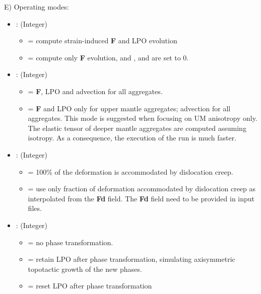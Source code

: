 E) Operating modes:
\begin{itemize}

    \item {}: (Integer)
    \begin{itemize}
        \item[]  = compute strain-induced \textbf{F} and LPO evolution
        \item[]  = compute only \textbf{F} evolution, and ,  and  are set to 0.
    \end{itemize}
    
    \item {}: (Integer)
    \begin{itemize}
        \item[]  = \textbf{F}, LPO and advection for all aggregates.
        \item[]  = \textbf{F} and LPO only for upper mantle aggregates; advection for all aggregates. This mode is suggested when focusing on UM anisotropy only. The elastic tensor of deeper mantle aggregates are computed assuming isotropy. As a consequence, the execution of the run is much faster.
    \end{itemize}
    
    \item {}: (Integer)
    \begin{itemize}
        \item[]  = 100\% of the deformation is accommodated by dislocation creep. 
        \item[]  = use only fraction of deformation accommodated by dislocation creep as interpolated from the \textbf{Fd} field. The \textbf{Fd} field need to be provided in input \vtptitle{} files.
    \end{itemize}
    
    \item {}: (Integer)
    \begin{itemize}
        \item[]  = no phase transformation.
        \item[]  = retain LPO after phase transformation, simulating axisymmetric topotactic growth of the new phases.
        \item[]  = reset LPO after phase transformation
    \end{itemize}
    

\end{itemize}
